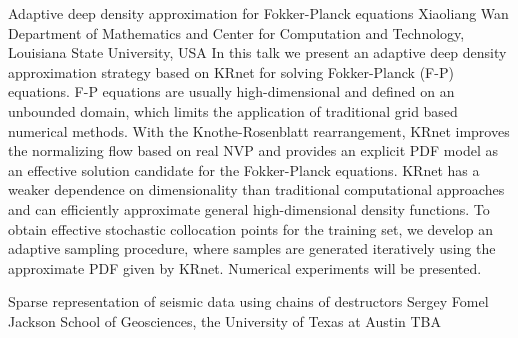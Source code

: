 \begin{addmargin}[2em]{0em}
\vspace{1.5ex}
\abs
{Adaptive deep density approximation for Fokker-Planck equations}
{Xiaoliang Wan}
{Department of Mathematics and Center for Computation and Technology, Louisiana State University, USA}
{In this talk we present an adaptive deep density approximation strategy based on KRnet for solving Fokker-Planck (F-P) equations. F-P equations are usually high-dimensional and defined on an unbounded domain, which limits the application of traditional grid based numerical methods. With the Knothe-Rosenblatt rearrangement, KRnet improves the normalizing flow based on real NVP and provides an explicit PDF model as an effective solution candidate for the Fokker-Planck equations. KRnet has a weaker dependence on dimensionality than traditional computational approaches and can efficiently approximate general high-dimensional density functions. To obtain effective stochastic collocation points for the training set, we develop an adaptive sampling procedure, where samples are generated iteratively using the approximate PDF given by KRnet. Numerical experiments will be presented.}


\vspace{1.5ex}
\abs
{Sparse representation of seismic data using chains of destructors}
{Sergey Fomel}
{Jackson School of Geosciences, the University of Texas at Austin}
{TBA}
\end{addmargin}
